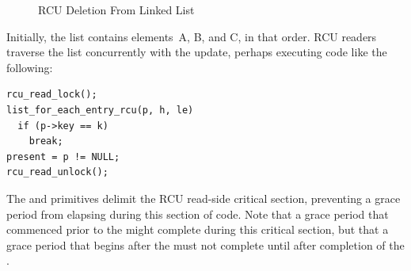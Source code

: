 \begin{figure}[htb]
\begin{center}
\end{center}
\caption{RCU Deletion From Linked List}
\label{fig:advsync:RCU Deletion From Linked List}
\end{figure}

Initially, the list contains elements~A, B, and C, in that order.
RCU readers traverse the list concurrently with the update,
perhaps executing code like the following:

\vspace{5pt}
\begin{minipage}[t]{\columnwidth}
\begin{verbatim}
rcu_read_lock();
list_for_each_entry_rcu(p, h, le)
  if (p->key == k)
  	break;
present = p != NULL;
rcu_read_unlock();
\end{verbatim}
\end{minipage}
\vspace{5pt}

The  and  primitives
delimit the RCU read-side critical section, preventing a grace
period from elapsing during this section of code.
Note that a grace period that commenced prior to the 
might complete during this critical section, but that a grace period
that begins after the  must not complete until
after completion of the .

